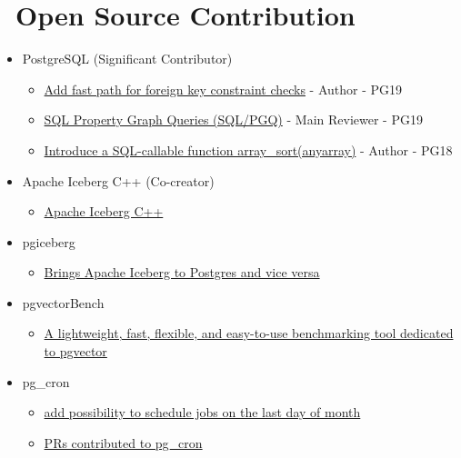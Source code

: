 \documentclass{resume}
\begin{document}
\section{\faCodeFork\ Open Source Contribution}
\begin{onehalfspacing}
  \begin{itemize}
    \item PostgreSQL (Significant Contributor)
      \begin{itemize}
        \item \href{https://git.postgresql.org/gitweb/?p=postgresql.git;a=commitdiff;h=2da86c1ef9b5446e0e22c0b6a5846293e58d98e3}{Add fast path for foreign key constraint checks} - Author - PG19
        \item \href{https://git.postgresql.org/gitweb/?p=postgresql.git;a=commitdiff;h=2f094e7ac691abc9d2fe0f4dcf0feac4a6ce1d9c}{SQL Property Graph Queries (SQL/PGQ)} - Main Reviewer - PG19
        \item \href{https://git.postgresql.org/gitweb/?p=postgresql.git;a=commitdiff;h=6c12ae09f5a5d6c153eaea7901542591dc28fb9e}{Introduce a SQL-callable function array\_sort(anyarray)} - Author - PG18
      \end{itemize}
    \item Apache Iceberg C++ (Co-creator)
      \begin{itemize}
        \item \href{https://github.com/apache/iceberg-cpp}{Apache Iceberg C++}
      \end{itemize}
    \item pgiceberg
      \begin{itemize}
        \item \href{https://github.com/pgiceberg/pgiceberg}{Brings Apache Iceberg to Postgres and vice versa}
      \end{itemize}
    \item pgvectorBench
      \begin{itemize}
        \item \href{https://github.com/zhjwpku/pgvectorBench}{A lightweight, fast, flexible, and easy-to-use benchmarking tool dedicated to pgvector}
      \end{itemize}
    \item pg\_cron
      \begin{itemize}
        \item \href{https://github.com/citusdata/pg_cron/pull/273}{add possibility to schedule jobs on the last day of month}
        \item \href{https://github.com/citusdata/pg_cron/pulls?q=is%3Apr+author%3A%40me+}{PRs contributed to pg\_cron}
      \end{itemize}
  \end{itemize}
  \end{onehalfspacing}
\end{document}
